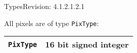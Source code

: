 \begin{manpage}{\libtitle}{Types}{$ $Revision: 4.1.2.1.2.1 $ $}
\subtitle{Pixel type}
    All pixels are of type \texttt{PixType}:

    \begin{tabular}{|l|l|}
    \hline
    \texttt{PixType} & 16 bit signed integer \\
    \hline
    \end{tabular}


\subtitle{Revision}

\end{manpage}
